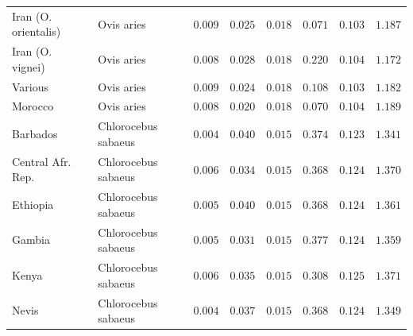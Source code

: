 \documentclass{article}
\begin{document}
\begin{center}
\begin{longtable*}{|l|l|r|r|r|r|r|r|}
            Iran (O. orientalis) & Ovis aries          & $ 0.009$        & $ 0.025$                   & $ 0.018$                      & $ 0.071$                             & $ 0.103$                      & $ 1.187$           \\
            Iran (O. vignei)     & Ovis aries          & $ 0.008$        & $ 0.028$                   & $ 0.018$                      & $ 0.220$                             & $ 0.104$                      & $ 1.172$           \\
            Various              & Ovis aries          & $ 0.009$        & $ 0.024$                   & $ 0.018$                      & $ 0.108$                             & $ 0.103$                      & $ 1.182$           \\
            Morocco              & Ovis aries          & $ 0.008$        & $ 0.020$                   & $ 0.018$                      & $ 0.070$                             & $ 0.104$                      & $ 1.189$           \\
            Barbados             & Chlorocebus sabaeus & $ 0.004$        & $ 0.040$                   & $ 0.015$                      & $ 0.374$                             & $ 0.123$                      & $ 1.341$           \\
            Central Afr. Rep.    & Chlorocebus sabaeus & $ 0.006$        & $ 0.034$                   & $ 0.015$                      & $ 0.368$                             & $ 0.124$ & $ 1.370$ \\
            Ethiopia             & Chlorocebus sabaeus & $ 0.005$        & $ 0.040$                   & $ 0.015$                      & $ 0.368$                             & $ 0.124$                      & $ 1.361$           \\
            Gambia               & Chlorocebus sabaeus & $ 0.005$        & $ 0.031$                   & $ 0.015$                      & $ 0.377$                             & $ 0.124$                      & $ 1.359$           \\
            Kenya                & Chlorocebus sabaeus & $ 0.006$        & $ 0.035$                   & $ 0.015$                      & $ 0.308$                             & $ 0.125$                      & $ 1.371$           \\
            Nevis                & Chlorocebus sabaeus & $ 0.004$        & $ 0.037$                   & $ 0.015$                      & $ 0.368$                             & $ 0.124$                      & $ 1.349$           \\

\end{longtable*}
\end{center}
\end{document}
